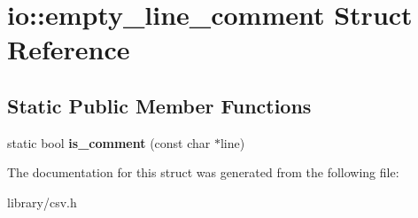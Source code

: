 \hypertarget{structio_1_1empty__line__comment}{}\section{io\+:\+:empty\+\_\+line\+\_\+comment Struct Reference}
\label{structio_1_1empty__line__comment}
\subsection*{Static Public Member Functions}
\begin{DoxyCompactItemize}
\item 
\mbox{\label{structio_1_1empty__line__comment_a88e2cee044a9aafabf3e2a0e64fa5289}} 
static bool {\bfseries is\+\_\+comment} (const char $\ast$line)
\end{DoxyCompactItemize}


The documentation for this struct was generated from the following file\+:\begin{DoxyCompactItemize}
\item 
library/csv.\+h\end{DoxyCompactItemize}
